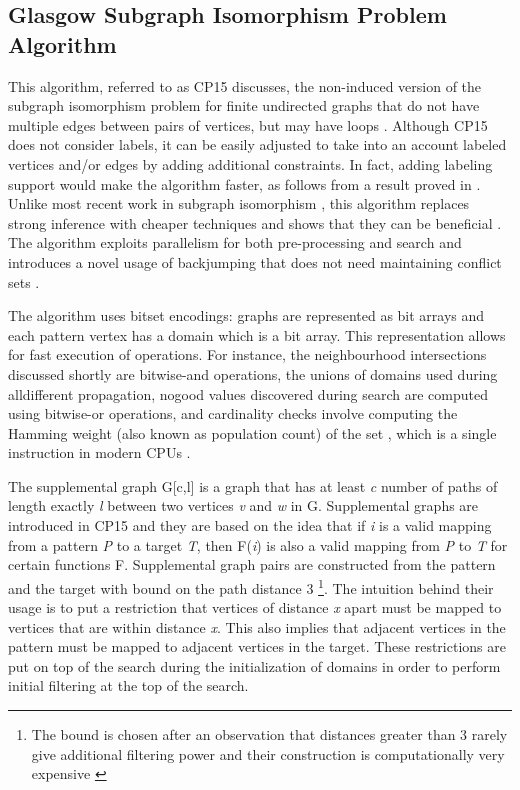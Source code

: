 \documentclass{l4proj}
\begin{document}
\subsection{Glasgow Subgraph Isomorphism Problem Algorithm}
\label{sec:sippatrick}
This algorithm, referred to as CP15 discusses, the non-induced version of the subgraph isomorphism problem for finite undirected graphs that do not have multiple edges between pairs of vertices, but may have loops \cite{CP2015}. Although CP15 does not consider labels, it can be easily adjusted to take into an account labeled vertices and/or edges by adding additional constraints. In fact, adding labeling support would make the algorithm faster, as follows from a result proved in \cite{Ciaran:2016}. Unlike most recent work in subgraph isomorphism \cite{Solnon:2010a,SND}, this algorithm replaces strong inference with cheaper techniques and shows that they can be beneficial \cite{CP2015}. The algorithm exploits parallelism for both pre-processing and search and introduces a novel usage of backjumping \cite{Prosser:1993} that does not need maintaining conflict sets \cite{CP2015}. 

The algorithm uses bitset encodings: graphs are represented as bit arrays and each pattern vertex has a domain which is a bit array. This representation allows for fast execution of operations. For instance, the neighbourhood intersections discussed shortly are bitwise-and operations, the unions of domains used during alldifferent propagation, nogood values discovered during search are computed using bitwise-or operations, and cardinality checks involve computing the Hamming weight (also known as population count) of the set \cite{Reed:1954}, which is a single instruction in modern CPUs \cite{CP2015}.  

The supplemental graph G[c,l] is a graph that has at least \emph{c}
number of paths of length exactly \emph{l} between two vertices \emph{v} and \emph{w} in G. Supplemental graphs are introduced in CP15 and they are based on the idea that if \emph{i} is a valid mapping from a pattern \emph{P} to a target \emph{T}, then F(\emph{i}) is also a valid mapping from \emph{P} to \emph{T} for certain functions F. Supplemental graph pairs are constructed from the pattern and the target with bound on the path distance 3 \footnote{The bound is chosen after an observation that distances greater than 3 rarely give additional filtering power and their construction is computationally very expensive \cite{CP2015}}. The intuition behind their usage is to put a restriction that vertices of distance \emph{x} apart must be mapped to vertices that are within distance \emph{x}. This also implies that adjacent vertices in the pattern must be mapped to adjacent vertices in the target. These restrictions are put on top of the search during the initialization of domains in order to perform initial filtering at the top of the search.
\end{document}
